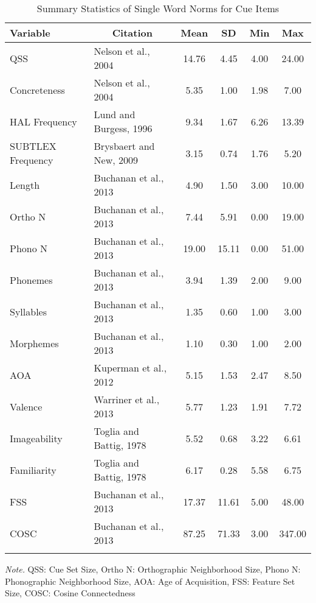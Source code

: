 \documentclass[english,man]{apa6}
\theoremstyle{definition}
\theoremstyle{definition}
\theoremstyle{definition}
\theoremstyle{remark}
\begin{document}
\begin{table}[tbp]
\begin{center}
\begin{threeparttable}
\caption{\label{tab:stim-table-cue}Summary Statistics of Single Word Norms for Cue Items}
\begin{tabular}{llcccc}
\toprule
Variable & \multicolumn{1}{c}{Citation} & \multicolumn{1}{c}{Mean} & \multicolumn{1}{c}{SD} & \multicolumn{1}{c}{Min} & \multicolumn{1}{c}{Max}\\
\midrule
QSS & Nelson et al., 2004 & 14.76 & 4.45 & 4.00 & 24.00\\
Concreteness & Nelson et al., 2004 & 5.35 & 1.00 & 1.98 & 7.00\\
HAL Frequency & Lund and Burgess, 1996 & 9.34 & 1.67 & 6.26 & 13.39\\
SUBTLEX Frequency & Brysbaert and New, 2009 & 3.15 & 0.74 & 1.76 & 5.20\\
Length & Buchanan et al., 2013 & 4.90 & 1.50 & 3.00 & 10.00\\
Ortho N & Buchanan et al., 2013 & 7.44 & 5.91 & 0.00 & 19.00\\
Phono N & Buchanan et al., 2013 & 19.00 & 15.11 & 0.00 & 51.00\\
Phonemes & Buchanan et al., 2013 & 3.94 & 1.39 & 2.00 & 9.00\\
Syllables & Buchanan et al., 2013 & 1.35 & 0.60 & 1.00 & 3.00\\
Morphemes & Buchanan et al., 2013 & 1.10 & 0.30 & 1.00 & 2.00\\
AOA & Kuperman et al., 2012 & 5.15 & 1.53 & 2.47 & 8.50\\
Valence & Warriner et al., 2013 & 5.77 & 1.23 & 1.91 & 7.72\\
Imageability & Toglia and Battig, 1978 & 5.52 & 0.68 & 3.22 & 6.61\\
Familiarity & Toglia and Battig, 1978 & 6.17 & 0.28 & 5.58 & 6.75\\
FSS & Buchanan et al., 2013 & 17.37 & 11.61 & 5.00 & 48.00\\
COSC & Buchanan et al., 2013 & 87.25 & 71.33 & 3.00 & 347.00\\
\bottomrule
\addlinespace
\end{tabular}
\begin{tablenotes}[para]
\textit{Note.} QSS: Cue Set Size, Ortho N: Orthographic Neighborhood Size, Phono N: Phonographic Neighborhood Size, AOA: Age of Acquisition, FSS: Feature Set Size, COSC: Cosine Connectedness
\end{tablenotes}
\end{threeparttable}
\end{center}
\end{table}
\end{document}
